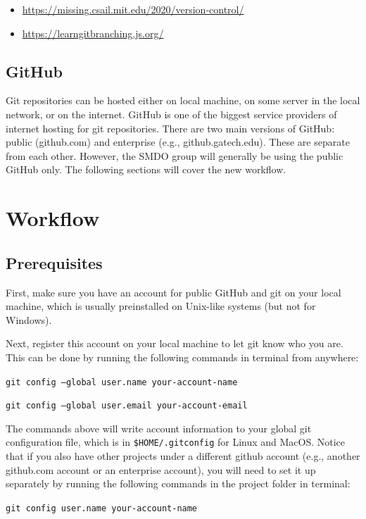 \documentclass[11pt]{article}
\begin{document}
\begin{itemize}
    \item \href{https://missing.csail.mit.edu/2020/version-control/}{https://missing.csail.mit.edu/2020/version-control/}
    \item \href{https://learngitbranching.js.org/}{https://learngitbranching.js.org/}
\end{itemize}

\subsection{GitHub}
Git repositories can be hosted either on local machine, on some server in the local network, or on the internet.
GitHub is one of the biggest service providers of internet hosting for git repositories.
There are two main versions of GitHub: public (github.com) and enterprise (e.g., github.gatech.edu).
These are separate from each other. However, the SMDO group will generally be using the public GitHub only.
The following sections will cover the new workflow.

\section{Workflow}
\subsection{Prerequisites}
First, make sure you have an account for public GitHub and git on your local machine, which is usually preinstalled on Unix-like systems (but not for Windows).

Next, register this account on your local machine to let git know who you are.
This can be done by running the following commands in terminal from anywhere:

\texttt{git config --global user.name your-account-name}

\texttt{git config --global user.email your-account-email}

The commands above will write account information to your global git configuration file, which is in \texttt{\$HOME/.gitconfig}
for Linux and MacOS.
Notice that if you also have other projects under a different github account (e.g., another github.com account
or an enterprise account), you will need to set it up separately by running the following
commands in the project folder in terminal:

\texttt{git config user.name your-account-name}
\end{document}
